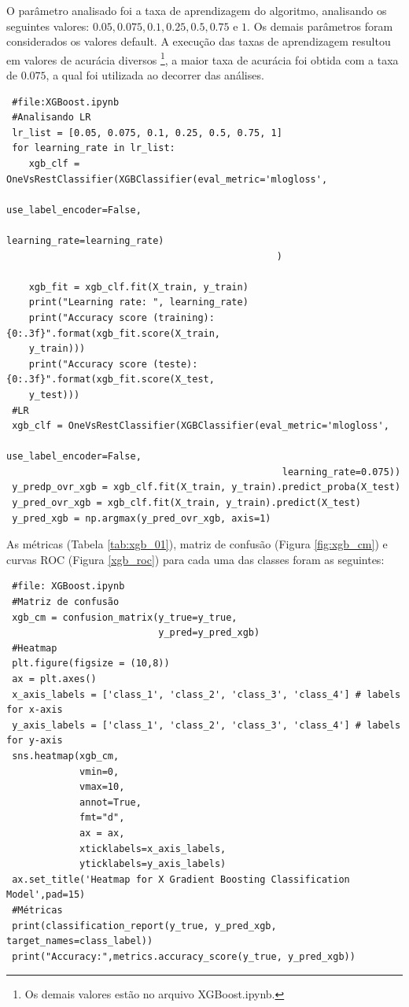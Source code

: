 \documentclass[
	article,			%
	11pt,				%
	oneside,			%
	a4paper,			%
	english,			%
	brazil,				%
	sumario=tradicional
	]{abntex2}
\begin{document}
O parâmetro analisado foi a taxa de aprendizagem do algoritmo, analisando os seguintes valores: $0.05, 0.075, 0.1, 0.25, 0.5, 0.75$ e $1$. Os demais parâmetros foram considerados os valores default. A execução das taxas de aprendizagem resultou em valores de acurácia diversos 
\footnote{Os demais valores estão no arquivo XGBoost.ipynb.}, a maior taxa de acurácia foi obtida com a taxa de $0.075$, a qual foi utilizada ao decorrer das análises. 

\begin{verbatim}
 #file:XGBoost.ipynb
 #Analisando LR
 lr_list = [0.05, 0.075, 0.1, 0.25, 0.5, 0.75, 1]
 for learning_rate in lr_list:
    xgb_clf = OneVsRestClassifier(XGBClassifier(eval_metric='mlogloss',
                                                use_label_encoder=False,
                                                learning_rate=learning_rate)
                                                )

    xgb_fit = xgb_clf.fit(X_train, y_train)
    print("Learning rate: ", learning_rate)
    print("Accuracy score (training): {0:.3f}".format(xgb_fit.score(X_train,
    y_train)))
    print("Accuracy score (teste): {0:.3f}".format(xgb_fit.score(X_test,
    y_test)))
 #LR
 xgb_clf = OneVsRestClassifier(XGBClassifier(eval_metric='mlogloss',
                                                 use_label_encoder=False,
                                                 learning_rate=0.075))
 y_predp_ovr_xgb = xgb_clf.fit(X_train, y_train).predict_proba(X_test)
 y_pred_ovr_xgb = xgb_clf.fit(X_train, y_train).predict(X_test)
 y_pred_xgb = np.argmax(y_pred_ovr_xgb, axis=1)
\end{verbatim}


As métricas (Tabela \ref{tab:xgb_01}), matriz de confusão (Figura \ref{fig:xgb_cm}) e curvas ROC (Figura \ref{xgb_roc}) para cada uma das classes foram as seguintes:

\begin{verbatim}
 #file: XGBoost.ipynb
 #Matriz de confusão
 xgb_cm = confusion_matrix(y_true=y_true, 
                           y_pred=y_pred_xgb)
 #Heatmap
 plt.figure(figsize = (10,8))
 ax = plt.axes()
 x_axis_labels = ['class_1', 'class_2', 'class_3', 'class_4'] # labels for x-axis
 y_axis_labels = ['class_1', 'class_2', 'class_3', 'class_4'] # labels for y-axis
 sns.heatmap(xgb_cm,
             vmin=0,
             vmax=10,
             annot=True,
             fmt="d",
             ax = ax,
             xticklabels=x_axis_labels, 
             yticklabels=y_axis_labels)
 ax.set_title('Heatmap for X Gradient Boosting Classification Model',pad=15)
 #Métricas
 print(classification_report(y_true, y_pred_xgb, target_names=class_label))
 print("Accuracy:",metrics.accuracy_score(y_true, y_pred_xgb))
 \end{verbatim}
\end{document}
